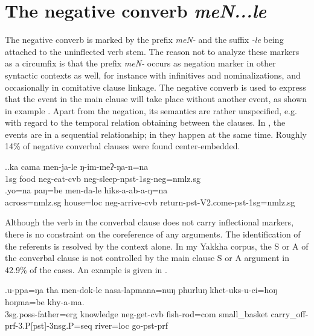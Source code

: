 	
\section{The negative converb \emph{meN...le}}\label{menle}

The negative converb is marked by the prefix \emph{meN-} and the suffix \emph{-le} being attached to the uninflected verb stem. The reason not to analyze these markers as a circumfix is that the prefix \emph{meN-} occurs as negation marker in other syntactic contexts as well, for instance with infinitives and nominalizations, and occasionally in comitative clause linkage. The negative converb is used to express that the event in the main clause will take place without another event, as shown in example \Next. Apart from the negation, its semantics are rather unspecified, e.g. with regard to the temporal relation obtaining between the clauses. In \Next, the events are in a sequential relationship; in \NNext they happen at the same time. Roughly 14\% of negative converbal clauses were found center-embedded.
	
	\ex.\ag.\label{menjale}ka cama men-ja-le ŋ-im-meʔ-ŋa-n=na\\
	{\sc 1sg} food   {\sc neg-}eat{\sc -cvb} {\sc neg-}sleep{\sc -npst-1sg-neg=nmlz.sg}\\
	\bg.yo=na paŋ=be men-da-le hiks-a-ab-a-ŋ=na\\
across{\sc =nmlz.sg} house{\sc =loc} {\sc neg}-arrive-{\sc cvb} return{\sc -pst-V2.come-pst-1sg=nmlz.sg}\\

Although the verb in the converbal clause does not carry inflectional markers, there is no constraint on the coreference of any arguments. The identification of the referents is resolved by the context alone. In my Yakkha corpus, the S or A of the converbal clause is not controlled by the main clause S or A argument in  42.9\% of the cases. An example is given in \Next.

\exg.u-ppa=ŋa tha men-dok-le nasa-lapmana=nuŋ phurluŋ khet-uks-u-ci=hoŋ hoŋma=be    khy-a-ma.\\
	{\sc 3sg.poss-}father={\sc erg} knowledge {\sc neg}-get-{\sc cvb} fish-rod{\sc =com}  small\_basket carry\_off{\sc -prf-3.P[pst]-3nsg.P=seq} river={\sc loc} go{\sc [3sg]-pst-prf}\\
		 


